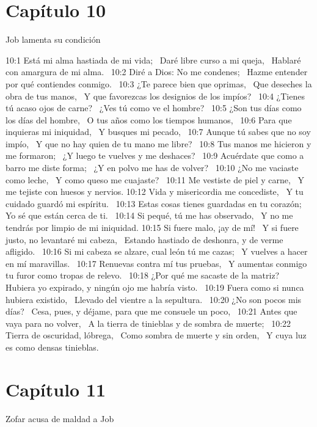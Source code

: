 \section*{Capítulo 10 }
Job lamenta su condición  

10:1 Está mi alma hastiada de mi vida;  
Daré libre curso a mi queja,  
Hablaré con amargura de mi alma.  
10:2 Diré a Dios: No me condenes;  
Hazme entender por qué contiendes conmigo.  
10:3 ¿Te parece bien que oprimas,  
Que deseches la obra de tus manos,  
Y que favorezcas los designios de los impíos?  
10:4 ¿Tienes tú acaso ojos de carne?  
¿Ves tú como ve el hombre?  
10:5 ¿Son tus días como los días del hombre,  
O tus años como los tiempos humanos,  
10:6 Para que inquieras mi iniquidad,  
Y busques mi pecado,  
10:7 Aunque tú sabes que no soy impío,  
Y que no hay quien de tu mano me libre?  
10:8 Tus manos me hicieron y me formaron;  
¿Y luego te vuelves y me deshaces?  
10:9 Acuérdate que como a barro me diste forma;  
¿Y en polvo me has de volver?  
10:10 ¿No me vaciaste como leche,  
Y como queso me cuajaste?  
10:11 Me vestiste de piel y carne,  
Y me tejiste con huesos y nervios. 
10:12 Vida y misericordia me concediste,  
Y tu cuidado guardó mi espíritu.  
10:13 Estas cosas tienes guardadas en tu corazón;  
Yo sé que están cerca de ti.  
10:14 Si pequé, tú me has observado,  
Y no me tendrás por limpio de mi iniquidad. 
10:15 Si fuere malo, ¡ay de mí!  
Y si fuere justo, no levantaré mi cabeza,  
Estando hastiado de deshonra, y de verme afligido.  
10:16 Si mi cabeza se alzare, cual león tú me cazas;  
Y vuelves a hacer en mí maravillas.  
10:17 Renuevas contra mí tus pruebas,  
Y aumentas conmigo tu furor como tropas de relevo.  
10:18 ¿Por qué me sacaste de la matriz?  
Hubiera yo expirado, y ningún ojo me habría visto.  
10:19 Fuera como si nunca hubiera existido,  
Llevado del vientre a la sepultura.  
10:20 ¿No son pocos mis días?  
Cesa, pues, y déjame, para que me consuele un poco,  
10:21 Antes que vaya para no volver,  
A la tierra de tinieblas y de sombra de muerte;  
10:22 Tierra de oscuridad, lóbrega,  
Como sombra de muerte y sin orden,  
Y cuya luz es como densas tinieblas.  
\section*{Capítulo 11}
Zofar acusa de maldad a Job  

